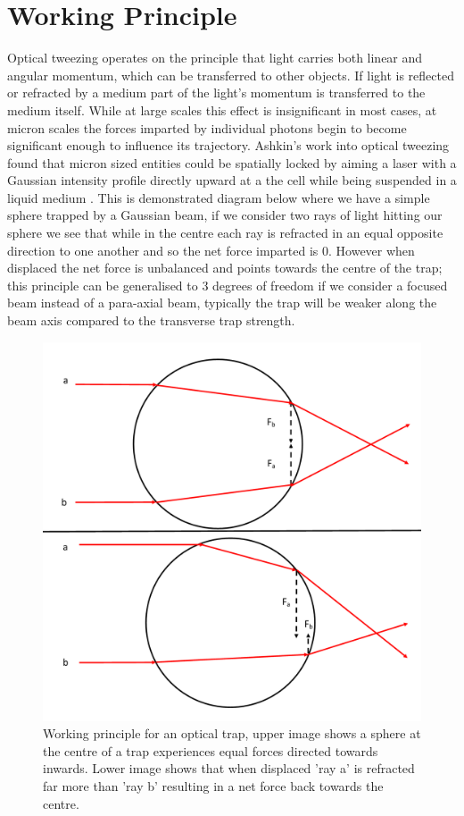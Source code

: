 \documentclass[a4paper,oneside,11pt]{book}
\begin{document}
\section{Working Principle}
Optical tweezing operates on the principle that light carries both linear and angular momentum, which can be transferred to other objects. If light is reflected or refracted by a medium part of the light's momentum is transferred to the medium itself. While at large scales this effect is insignificant in most cases, at micron scales the forces imparted by individual photons begin to become significant enough to influence its trajectory. Ashkin's work into optical tweezing found that micron sized entities could be spatially locked by aiming a laser with a Gaussian intensity profile directly upward at a the cell while being suspended in a liquid medium \cite{Ashkin1970}. This is demonstrated diagram below where we have a simple sphere trapped by a Gaussian beam, if we consider two rays of light hitting our sphere we see that while in the centre each ray is refracted in an equal opposite direction to one another and so the net force imparted is 0. However when displaced the net force is unbalanced and points towards the centre of the trap; this principle can be generalised to 3 degrees of freedom if we consider a focused beam instead of a para-axial beam, typically the trap will be weaker along the beam axis compared to the transverse trap strength.  

\begin{figure}[h]
	\centering
	\includegraphics[width=0.65\linewidth]{figs/ot_working_principal.png}
	\caption{Working principle for an optical trap, upper image shows a sphere at the centre of a trap experiences equal forces directed towards inwards. Lower image shows that when displaced 'ray a' is refracted far more than 'ray b' resulting in a net force back towards the centre.}
\end{figure}
\end{document}
